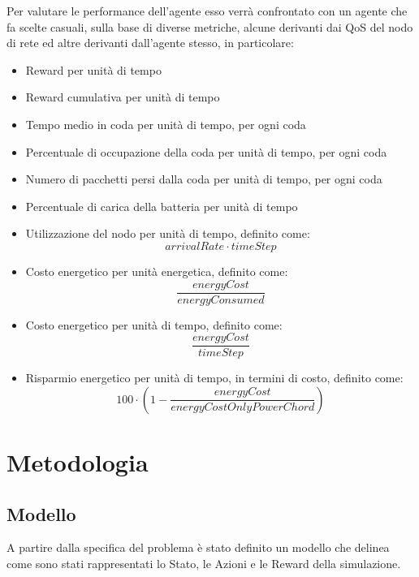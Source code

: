 \documentclass[conference]{IEEEtran}
\begin{document}
Per valutare le performance dell'agente esso verrà confrontato con un agente che fa scelte casuali, sulla base di diverse metriche, alcune derivanti dai QoS del nodo di rete ed altre derivanti dall'agente stesso, in particolare:
\begin{itemize}
    \item Reward per unità di tempo
    \item Reward cumulativa per unità di tempo
    \item Tempo medio in coda per unità di tempo, per ogni coda
    \item Percentuale di occupazione della coda per unità di tempo, per ogni coda
    \item Numero di pacchetti persi dalla coda per unità di tempo, per ogni coda
    \item Percentuale di carica della batteria per unità di tempo
    \item Utilizzazione del nodo per unità di tempo, definito come:  
    \begin{equation}
        \label{eq:utilization_eq} 
        {arrivalRate}\cdot{timeStep}
    \end{equation}
    \item Costo energetico per unità energetica, definito come: 
    \begin{equation}
        \label{eq:cexue_eq} 
        \frac{energyCost}{energyConsumed}
    \end{equation}
    \item Costo energetico per unità di tempo, definito come: 
    \begin{equation}
        \label{eq:cexut_eq}
        \frac{energyCost}{timeStep}
    \end{equation}
    \item Risparmio energetico per unità di tempo, in termini di costo, definito come: 
    \begin{equation}
        \label{eq:re_eq}
    100\cdot(1-\frac{energyCost}{energyCostOnlyPowerChord})
    \end{equation}
\end{itemize}

\section{Metodologia}

\subsection{Modello}
A partire dalla specifica del problema è stato definito un modello che delinea come
sono stati rappresentati lo Stato, le Azioni e le Reward della simulazione.
\end{document}
